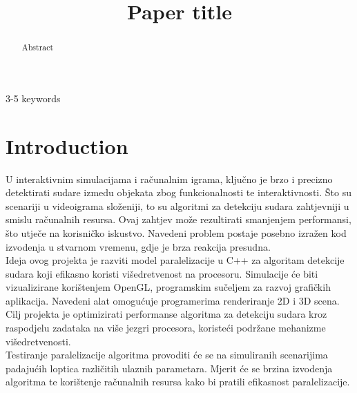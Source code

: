 \documentclass[conference]{IEEEtran}
\begin{document}
\title{Paper title}

\author{
    \and
    \and
}


\maketitle

\begin{abstract}
Abstract
\end{abstract}

\begin{IEEEkeywords}
    3-5 keywords
\end{IEEEkeywords}

\section{Introduction}
U interaktivnim simulacijama i računalnim igrama, ključno je brzo i precizno detektirati sudare izmedu objekata zbog funkcionalnosti te interaktivnosti. Što su scenariji u videoigrama složeniji, to su algoritmi za detekciju sudara zahtjevniji u smislu računalnih resursa. Ovaj zahtjev može rezultirati smanjenjem performansi, što utječe na korisničko iskustvo. Navedeni problem postaje posebno izražen kod izvodenja u stvarnom vremenu, gdje je brza reakcija presudna.\\
Ideja ovog projekta je razviti model paralelizacije u C++ za algoritam detekcije sudara koji efikasno koristi višedretvenost na procesoru. Simulacije će biti vizualizirane korištenjem OpenGL, programskim sučeljem za razvoj grafičkih aplikacija. Navedeni alat omogućuje programerima renderiranje 2D i 3D scena. Cilj projekta je optimizirati performanse algoritma za detekciju sudara kroz raspodjelu zadataka na više jezgri procesora, koristeći podržane mehanizme višedretvenosti.\\
Testiranje paralelizacije algoritma provoditi će se na simuliranih scenarijima padajućih loptica različitih ulaznih parametara. Mjerit će se brzina izvodenja algoritma te korištenje računalnih resursa kako bi pratili efikasnost paralelizacije.
\end{document}
